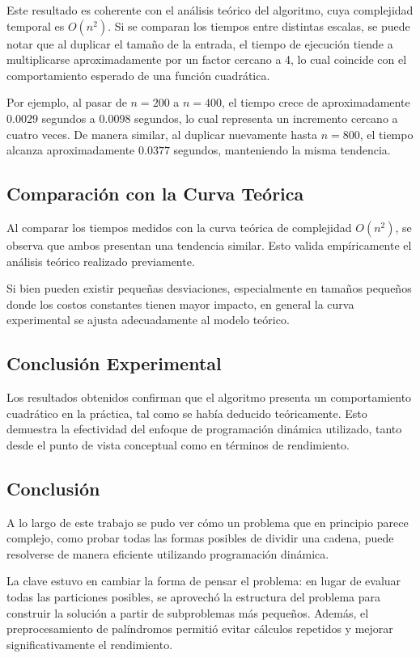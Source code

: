Este resultado es coherente con el análisis teórico del algoritmo, cuya complejidad temporal es $O(n^2)$. Si se comparan los tiempos entre 
distintas escalas, se puede notar que al duplicar el tamaño de la entrada, el tiempo de ejecución tiende a multiplicarse 
aproximadamente por un factor cercano a 4, lo cual coincide con el comportamiento esperado de una función cuadrática.

Por ejemplo, al pasar de $n = 200$ a $n = 400$, el tiempo crece de aproximadamente $0.0029$ segundos a $0.0098$ segundos, lo cual 
representa un incremento cercano a cuatro veces. De manera similar, al duplicar nuevamente hasta $n = 800$, el tiempo 
alcanza aproximadamente $0.0377$ segundos, manteniendo la misma tendencia.

\subsection{Comparación con la Curva Teórica}

Al comparar los tiempos medidos con la curva teórica de complejidad $O(n^2)$, se observa que ambos presentan una tendencia similar. 
Esto valida empíricamente el análisis teórico realizado previamente.

Si bien pueden existir pequeñas desviaciones, especialmente en tamaños pequeños donde los costos constantes tienen mayor impacto, 
en general la curva experimental se ajusta adecuadamente al modelo teórico.

\subsection{Conclusión Experimental}

Los resultados obtenidos confirman que el algoritmo presenta un comportamiento cuadrático en la práctica, tal como se había deducido teóricamente. 
Esto demuestra la efectividad del enfoque de programación dinámica utilizado, tanto desde el punto de vista conceptual como en términos de rendimiento.

\subsection{Conclusión}

A lo largo de este trabajo se pudo ver cómo un problema que en principio parece complejo, como probar todas las formas posibles de dividir una cadena, 
puede resolverse de manera eficiente utilizando programación dinámica.

La clave estuvo en cambiar la forma de pensar el problema: en lugar de evaluar todas las particiones posibles, se aprovechó la estructura del 
problema para construir la solución a partir de subproblemas más pequeños. Además, el preprocesamiento de palíndromos permitió 
evitar cálculos repetidos y mejorar significativamente el rendimiento.

